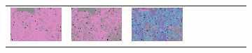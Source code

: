 \documentclass{ipol}
\begin{document}
\begin{figure}[ht]
\begin{subfigure}[t]{\linewidth}
\begin{tabular}{ccccccccc}
                \includegraphics[width=\s]{images/carnival/AHD/bid_j100_64_grids.png}&
                \includegraphics[width=\s]{images/carnival/DCB/bid_j100_64_grids.png}&
                \includegraphics[width=\s]{images/carnival/DHT/bid_j100_64_grids.png}&

\end{tabular}
\end{subfigure}
\end{figure}
\end{document}
